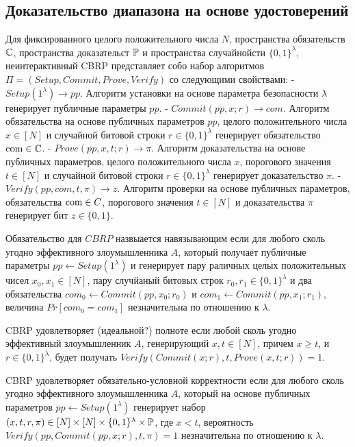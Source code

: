 \subsection{Доказательство диапазона на основе удостоверений} %
Для фиксированного целого положительного числа $N$, пространства обязательств $\C$, пространства доказательст $\P$ и пространства случайнойсти $\{0, 1\}^\lambda$, неинтерактивный CBRP представляет собо набор алгоритмов $\Pi = (Setup, Commit, Prove, Verify)$ со следующими свойствами:
- $Setup(1^\lambda) \rightarrow pp$. Алгоритм установки на основе параметра безопасности $\lambda$ генерирует публичные параметры $pp$.
- $Commit(pp, x; r) \rightarrow com$. Алгоритм обязательства на основе публичных параметров $pp$, целого положительного числа $x \in [N]$ и случайной битовой строки $r \in \{0, 1\}^\lambda$ генерирует обязательство $\com \in \C$.
- $Prove(pp, x, t; r) \rightarrow \pi$. Алгоритм доказательства на основе публичных параметров, целого положительного числа $x$, порогового значения $t \in [N]$ и случайной битовой строки $r \in \{0, 1\}^\lambda$ генерирует доказательство $\pi$.
- $Verify(pp, com, t, \pi) \rightarrow z$. Алгоритм проверки на основе публичных параметров, обязательства $\com \in C$, порогового значения $t \in [N]$ и доказательства $\pi$ генерирует бит $z \in \{0, 1\}$.


Обязательство для $CBRP$ назвыается навязывающим если для любого сколь угодно эффективного злоумышленника $A$, который получает публичные параметры $pp \leftarrow Setup(1^\lambda)$ и генерирует пару раличных целых положительных чисел $x_0, x_1 \in [N]$, пару случйаный битовых строк $r_0, r_1 \in \{0, 1\}^\lambda$ и два обязательства $com_0 \leftarrow Commit(pp, x_0; r_0)$ и $com_1 \leftarrow Commit(pp, x_1; r_1)$, величина $Pr[com_0 = com_1]$ незначительна по отношению к $\lambda$.

CBRP удовлетворяет (идеальной?) полноте если любой сколь угодно эффективный злоумышленник $A$, генерирующий $x, t \in [N]$, причем  $x \geq t$, и $r \in \{0, 1\}^\lambda$, будет получать $Verify(Commit(x; r), t, Prove(x, t; r)) = 1$.

CBRP удовлетворяет обязательно-условной корректности если для любого сколь угодно эффективного злоумышленника $A$, который на основе публичных параметров $pp \leftarrow Setup(1^\lambda)$ генерирует набор $(x, t, r, \pi) \in [N] \times [N] \times \{0, 1\}^\lambda \times \P$, где $x < t$, вероятность $Verify(pp, Commit(pp, x; r), t, \pi) = 1$ незначительна по отношению к $\lambda$.
